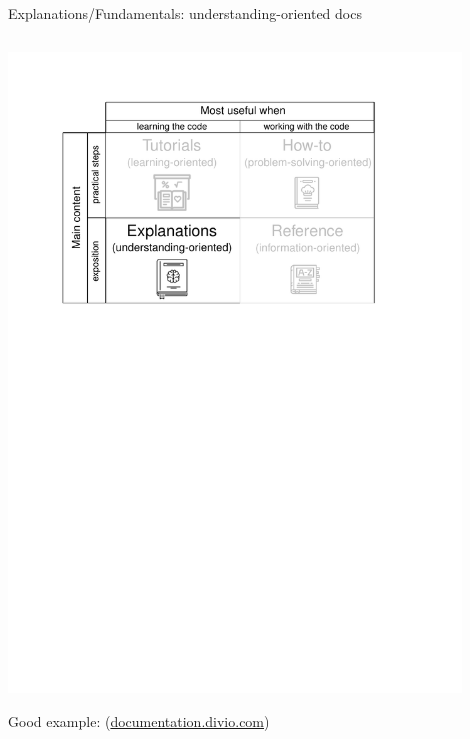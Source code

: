 \documentclass[english,aspectratio=169]{beamer}
\begin{document}
\begin{frame}{Explanations/Fundamentals: understanding-oriented docs}
\begin{columns}[onlytextwidth]
\begin{column}{0.5\textwidth}
    \begin{center}
    \includegraphics[width=0.9\textwidth]{./figures/documentation-system-explanations}
    \end{center}
    \begin{exampleblock}{}
        \centering
        Good example:
        (\url{documentation.divio.com})
    \end{exampleblock}
\end{column}

\end{columns}

\end{frame}
\end{document}
